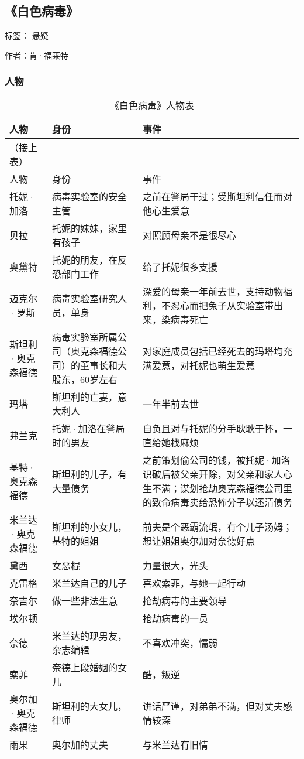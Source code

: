 \subsection{《白色病毒》}

标签： 悬疑

作者：肯·福莱特

\subsubsection{人物}

\begin{longtable}{p{} | p{} | p{}}

    \caption{《白色病毒》人物表} \\
    \hline
人物 & 身份 & 事件 \\
\hline
\endfirsthead

（接上表） \\
人物 & 身份 & 事件 \\
\hline
\endhead

\hline
\endfoot

托妮·加洛 & 病毒实验室的安全主管 &之前在警局干过；受斯坦利信任而对他心生爱意 \\
贝拉 & 托妮的妹妹，家里有孩子 & 对照顾母亲不是很尽心 \\
奥黛特 & 托妮的朋友，在反恐部门工作 & 给了托妮很多支援 \\
迈克尔·罗斯 & 病毒实验室研究人员，单身 & 深爱的母亲一年前去世，支持动物福利，不忍心而把兔子从实验室带出来，染病毒死亡 \\
斯坦利·奥克森福德 & 病毒实验室所属公司（奥克森福德公司）的董事长和大股东，60岁左右 & 对家庭成员包括已经死去的玛塔均充满爱意，对托妮也萌生爱意 \\
玛塔 & 斯坦利的亡妻，意大利人 & 一年半前去世 \\
弗兰克 & 托妮·加洛在警局时的男友 & 自负且对与托妮的分手耿耿于怀，一直给她找麻烦 \\
基特·奥克森福德 & 斯坦利的儿子，有大量债务 &  之前策划偷公司的钱，被托妮·加洛识破后被父亲开除，对父亲和家人心生不满；谋划抢劫奥克森福德公司里的致命病毒卖给恐怖分子以还清债务 \\
米兰达·奥克森福德 & 斯坦利的小女儿，基特的姐姐  & 前夫是个恶霸流氓，有个儿子汤姆；想让姐姐奥尔加对奈德好点 \\
黛西 & 女恶棍 & 力量很大，光头 \\
克雷格 & 米兰达自己的儿子 & 喜欢索菲，与她一起行动 \\
奈吉尔 & 做一些非法生意 & 抢劫病毒的主要领导 \\
埃尔顿 & & 抢劫病毒的一员 \\
奈德 & 米兰达的现男友，杂志编辑 & 不喜欢冲突，懦弱 \\
索菲 & 奈德上段婚姻的女儿 & 酷，叛逆 \\
奥尔加·奥克森福德 &斯坦利的大女儿，律师 & 讲话严谨，对弟弟不满，但对丈夫感情较深 \\
雨果 & 奥尔加的丈夫 & 与米兰达有旧情 \\
\end{longtable}


